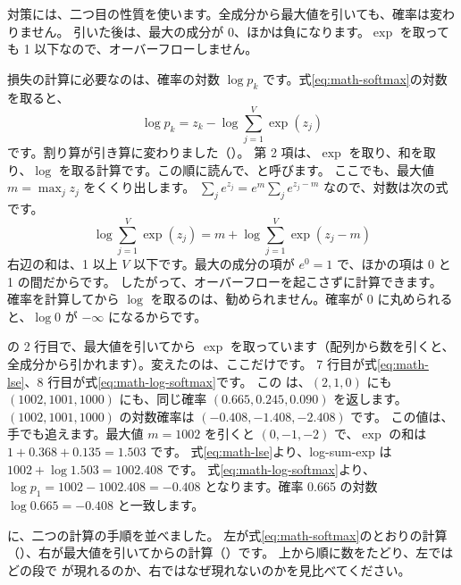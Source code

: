対策には、二つ目の性質を使います。全成分から最大値を引いても、確率は変わりません。
引いた後は、最大の成分が 0、ほかは負になります。$\exp$ を取っても 1 以下なので、オーバーフローしません。

損失の計算に必要なのは、確率の対数 $\log p_k$ です。式\eqref{eq:math-softmax}の対数を取ると、
\begin{equation}
\log p_k=z_k-\log\sum_{j=1}^{V}\exp(z_j)
\label{eq:math-log-softmax}
\end{equation}
です。割り算が引き算に変わりました（）。
第 2 項は、$\exp$ を取り、和を取り、$\log$ を取る計算です。この順に読んで、と呼びます。
ここでも、最大値 $m=\max_j z_j$ をくくり出します。
$\sum_j e^{z_j}=e^{m}\sum_j e^{z_j-m}$ なので、対数は次の式です。
\begin{equation}
\log\sum_{j=1}^{V}\exp(z_j)=m+\log\sum_{j=1}^{V}\exp(z_j-m)
\label{eq:math-lse}
\end{equation}
右辺の和は、1 以上 $V$ 以下です。最大の成分の項が $e^{0}=1$ で、ほかの項は 0 と 1 の間だからです。
したがって、オーバーフローを起こさずに計算できます。
確率を計算してから $\log$ を取るのは、勧められません。確率が 0 に丸められると、$\log 0$ が $-\infty$ になるからです。


の 2 行目で、最大値を引いてから $\exp$ を取っています（配列から数を引くと、全成分から引かれます）。変えたのは、ここだけです。
7 行目が式\eqref{eq:math-lse}、8 行目が式\eqref{eq:math-log-softmax}です。
この  は、$(2,1,0)$ にも $(1002,1001,1000)$ にも、同じ確率 $(0.665,0.245,0.090)$ を返します。
$(1002,1001,1000)$ の対数確率は $(-0.408,-1.408,-2.408)$ です。
この値は、手でも追えます。最大値 $m=1002$ を引くと $(0,-1,-2)$ で、$\exp$ の和は $1+0.368+0.135=1.503$ です。
式\eqref{eq:math-lse}より、log-sum-exp は $1002+\log 1.503=1002.408$ です。
式\eqref{eq:math-log-softmax}より、$\log p_1=1002-1002.408=-0.408$ となります。確率 0.665 の対数 $\log 0.665=-0.408$ と一致します。

に、二つの計算の手順を並べました。
左が式\eqref{eq:math-softmax}のとおりの計算（）、右が最大値を引いてからの計算（）です。
上から順に数をたどり、左ではどの段で  が現れるのか、右ではなぜ現れないのかを見比べてください。

